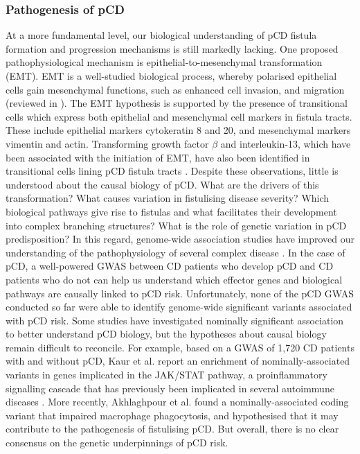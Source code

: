 \subsubsection{Pathogenesis of pCD}
At a more fundamental level, our biological understanding of pCD fistula formation and progression mechanisms is still markedly lacking. One proposed pathophysiological mechanism is epithelial-to-mesenchymal transformation (EMT). EMT is a well-studied biological process, whereby polarised epithelial cells gain mesenchymal functions, such as enhanced cell invasion, and migration (reviewed in \cite{Kalluri2009-uu}). The EMT hypothesis is supported by the presence of transitional cells which express both epithelial and mesenchymal cell markers in fistula tracts. These include epithelial markers cytokeratin 8 and 20, and mesenchymal markers vimentin and actin. Transforming growth factor $\beta$ and interleukin-13, which have been associated with the initiation of EMT, have also been identified in transitional cells lining pCD fistula tracts \cite{Scharl2013-uf,Bataille2008-ej,Bataille2004-vf}. Despite these observations, little is understood about the causal biology of pCD. What are the drivers of this transformation? What causes variation in fistulising disease severity? Which biological pathways give rise to fistulas and what facilitates their development into complex branching structures? What is the role of genetic variation in pCD predisposition? In this regard, genome-wide association studies have improved our understanding of the pathophysiology of several complex disease \cite{Cano-Gamez2020-nm}. In the case of pCD, a well-powered GWAS between CD patients who develop pCD and CD patients who do not can help us understand which effector genes and biological pathways are causally linked to pCD risk. Unfortunately, none of the pCD GWAS conducted so far were able to identify genome-wide significant variants associated with pCD risk. Some studies have investigated nominally significant association to better understand pCD biology, but the hypotheses about causal biology remain difficult to reconcile. For example, based on a GWAS of 1,720 CD patients with and without pCD, Kaur et al. \cite{Kaur2016-bs} report an enrichment of nominally-associated variants in genes implicated in the JAK/STAT pathway, a proinflammatory signalling cascade that has previously been implicated in several autoimmune diseases \cite{Hu2021-us,Seif2017-bk}. More recently, Akhlaghpour et al. \cite{Akhlaghpour2023-jw} found a nominally-associated coding variant that impaired macrophage phagocytosis, and hypothesised that it may contribute to the pathogenesis of fistulising pCD. But overall, there is no clear consensus on the genetic underpinnings of pCD risk.\\

